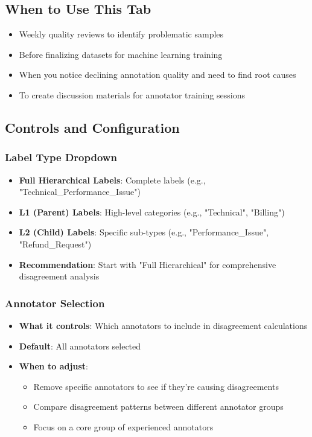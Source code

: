 \documentclass[11pt]{article}
\begin{document}
\subsection{When to Use This Tab}
\begin{itemize}
\item Weekly quality reviews to identify problematic samples
\item Before finalizing datasets for machine learning training
\item When you notice declining annotation quality and need to find root causes
\item To create discussion materials for annotator training sessions
\end{itemize}

\subsection{Controls and Configuration}

\subsubsection{Label Type Dropdown}
\begin{itemize}
\item \textbf{Full Hierarchical Labels}: Complete labels (e.g., "Technical\_Performance\_Issue")
\item \textbf{L1 (Parent) Labels}: High-level categories (e.g., "Technical", "Billing")
\item \textbf{L2 (Child) Labels}: Specific sub-types (e.g., "Performance\_Issue", "Refund\_Request")
\item \textbf{Recommendation}: Start with "Full Hierarchical" for comprehensive disagreement analysis
\end{itemize}

\subsubsection{Annotator Selection}
\begin{itemize}
\item \textbf{What it controls}: Which annotators to include in disagreement calculations
\item \textbf{Default}: All annotators selected
\item \textbf{When to adjust}:
\begin{itemize}
\item Remove specific annotators to see if they're causing disagreements
\item Compare disagreement patterns between different annotator groups
\item Focus on a core group of experienced annotators
\end{itemize}
\end{itemize}
\end{document}
